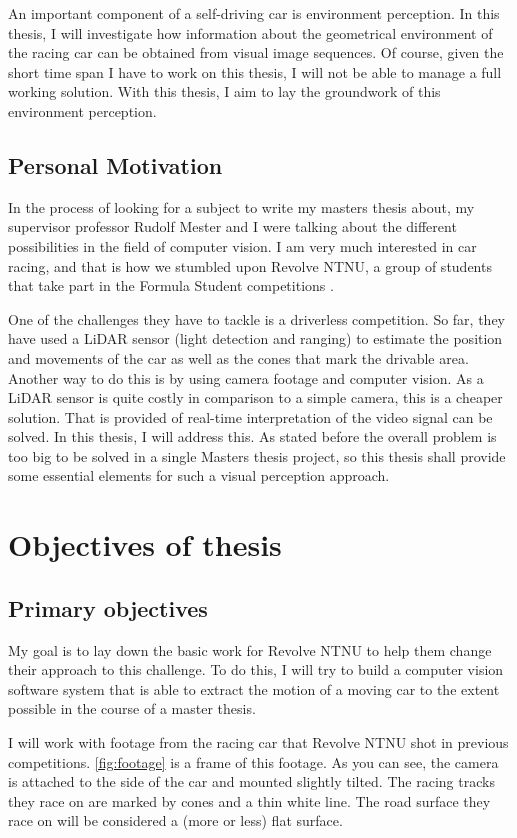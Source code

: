 An important component of a self-driving car is environment perception. In this thesis, I will investigate how information about the geometrical environment of the racing car can be obtained from visual image sequences. Of course, given the short time span I have to work on this thesis, I will not be able to manage a full working solution. With this thesis, I aim to lay the groundwork of this environment perception.

\subsection{Personal Motivation}
In the process of looking for a subject to write my masters thesis about, my supervisor professor Rudolf Mester and I were talking about the different possibilities in the field of computer vision. I am very much interested in car racing, and that is how we stumbled upon Revolve NTNU, a group of students that take part in the Formula Student competitions \cite{unknown-author-no-date}.\bigskip

One of the challenges they have to tackle is a driverless competition. So far, they have used a LiDAR sensor (light detection and ranging) to estimate the position and movements of the car as well as the cones that mark the drivable area. Another way to do this is by using camera footage and computer vision. As a LiDAR sensor is quite costly in comparison to a simple camera, this is a cheaper solution. That is provided of real-time interpretation of the video signal can be solved. In this thesis, I will address this. As stated before the overall problem is too big to be solved in a single Masters thesis project, so this thesis shall provide some essential elements for such a visual perception approach.\bigskip

\section{Objectives of thesis}
\subsection{Primary objectives}
My goal is to lay down the basic work for Revolve NTNU to help them change their approach to this challenge. To do this, I will try to build a computer vision software system that is able to extract the motion of a moving car to the extent possible in the course of a master thesis. \bigskip

I will work with footage from the racing car that Revolve NTNU shot in previous competitions. \autoref{fig:footage} is a frame of this footage. As you can see, the camera is attached to the side of the car and mounted slightly tilted. The racing tracks they race on are marked by cones and a thin white line. The road surface they race on will be considered a (more or less) flat surface.\bigskip


